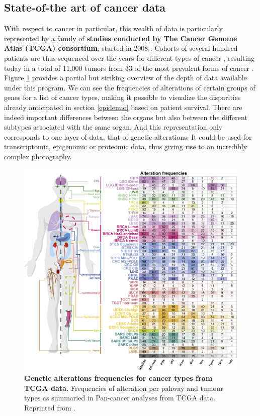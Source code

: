 \documentclass[a4paper,12pt,twoside,onecolumn,openright,final,oldfontcommands]{memoir}
\begin{document}
\subsection{State-of-the art of cancer
data}\label{state-of-the-art-of-cancer-data}

With respect to cancer in particular, this wealth of data is
particularly represented by a family of \textbf{studies conducted by The
Cancer Genome Atlas (TCGA) consortium}, started in 2008
\citep{cancer2008comprehensive}. Cohorts of several hundred patients are
thus sequenced over the years for different types of cancer
\citep{cancer2012comprehensive}, resulting today in a total of 11,000
tumors from 33 of the most prevalent forms of cancer
\citep{ding2018perspective}. Figure \ref{fig:tcga} provides a partial
but striking overview of the depth of data available under this program.
We can see the frequencies of alterations of certain groups of genes for
a list of cancer types, making it possible to visualize the disparities
already anticipated in section \ref{epidemio} based on patient survival.
There are indeed important differences between the organs but also
between the different subtypes associated with the same organ. And this
representation only corresponds to one layer of data, that of genetic
alterations. It could be used for transcriptomic, epigenomic or
proteomic data, thus giving rise to an incredibly complex photography.

\begin{figure}

{\centering \includegraphics[width=0.9\linewidth]{fig/tcga} 

}

\caption[Genetic alterations frequencies for cancer types from TCGA data]{\textbf{Genetic alterations frequencies for cancer
types from TCGA data.} Frequencies of alteration per pahway and tumour
types as summaried in Pan-cancer analyses from TCGA data. Reprinted from
\citet{sanchez2018oncogenic}.}\label{fig:tcga}
\end{figure}
\end{document}
